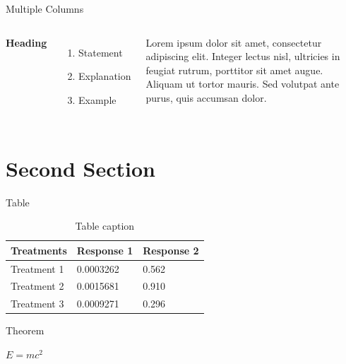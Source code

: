 \documentclass[aspectratio=169,xcolor=dvipsnames]{beamer}
\begin{document}

\begin{frame}{Multiple Columns}
	\begin{columns}[c] %

		\textbf{Heading}
		\begin{enumerate}
			\item Statement
			\item Explanation
			\item Example
		\end{enumerate}

		Lorem ipsum dolor sit amet, consectetur adipiscing elit. Integer lectus nisl, ultricies in feugiat rutrum, porttitor sit amet augue. Aliquam ut tortor mauris. Sed volutpat ante purus, quis accumsan dolor.

	\end{columns}
\end{frame}

\section{Second Section}

\begin{frame}{Table}
	\begin{table}
		\begin{tabular}{l l l}
			\toprule
			\textbf{Treatments} & \textbf{Response 1} & \textbf{Response 2} \\
			\midrule
			Treatment 1         & 0.0003262           & 0.562               \\
			Treatment 2         & 0.0015681           & 0.910               \\
			Treatment 3         & 0.0009271           & 0.296               \\
			\bottomrule
		\end{tabular}
		\caption{Table caption}
	\end{table}
\end{frame}


\begin{frame}{Theorem}
	\begin{theorem}
		$E = mc^2$
	\end{theorem}
\end{frame}
\end{document}
